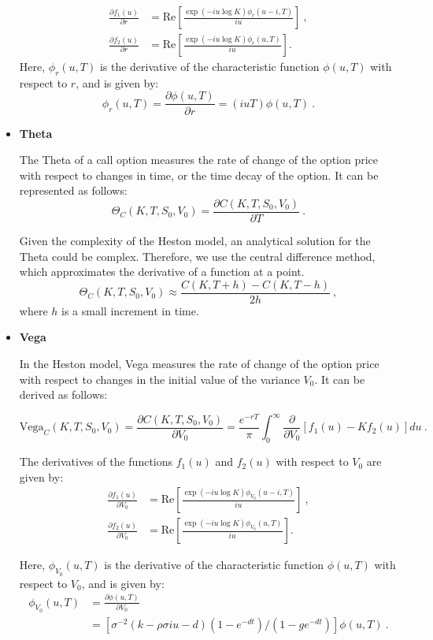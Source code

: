 \begin{itemize}
\begin{equation}
\label{eq:derivative-r-f1-f2}
\begin{aligned}
\frac{ \partial  f_1(u)   }{\partial r}&= \mathrm{Re}\left[  \frac{\exp(-iu\log K) \phi_{r}(u-i,T)   }{iu}\right] \ ,  \\  
\frac{\partial  f_2(u)   }{\partial r } &= \mathrm{Re}\left[ \frac{\exp(-iu\log K) \phi_{r}(u,T)  }{iu}\right].
\end{aligned}
\end{equation}
Here, $\phi_{r}(u,T)$ is the derivative of the characteristic function $\phi(u,T)$ with respect to $r$, and is given by:
$$
\phi_{r}(u,T) = \frac{ \partial  \phi(u,T)}{\partial r} = (i u T) \phi(u,T) \ .
$$




\item \textbf{Theta} 

The Theta of a call option measures the rate of change of the option price with respect to changes in time, or the time decay of the option. It can be represented as follows:
$$
\Theta_C(K,T, S_0, V_0) = \frac{\partial C(K,T, S_0, V_0)}{\partial T} \ . 
$$

Given the complexity of the Heston model, an analytical solution for the Theta could be complex. Therefore, we use the central difference method, which approximates the derivative of a function at a point.
$$
\Theta_C(K,T, S_0, V_0) \approx \frac{C(K,T+h) - C(K,T-h)}{2h} \ , 
$$
where $h$ is a small increment in time. 


\item \textbf{Vega} 

In the Heston model, Vega measures the rate of change of the option price with respect to changes in the initial value of the variance $V_0$. It can be derived as follows:

$$
\text{Vega}_C(K,T, S_0, V_0) = \frac{\partial C(K,T, S_0, V_0)}{\partial V_0} = \frac{e^{-r T}}{\pi} \int_0^{\infty}\frac{ \partial  }{\partial V_0}  \left[f_1(u) - Kf_2(u)\right]du \ . 
$$

The derivatives of the functions $ f_1(u) $ and $ f_2(u) $ with respect to $ V_0$ are given by:
\begin{equation}
\label{eq:derivative-v0-f1-f2}
\begin{aligned}
\frac{ \partial  f_1(u)   }{\partial V_0}&= \mathrm{Re}\left[  \frac{\exp(-iu\log K) \phi_{V_0}(u-i,T)   }{iu}\right]  \ , \\  
\frac{\partial  f_2(u)   }{\partial V_0 } &= \mathrm{Re}\left[ \frac{\exp(-iu\log K) \phi_{V_0}(u,T)  }{iu}\right].
\end{aligned}
\end{equation}

Here, $\phi_{V_0}(u,T)$ is the derivative of the characteristic function $\phi(u,T)$ with respect to $V_0$, and is given by:
$$
\begin{aligned}
\phi_{V_0}(u,T) &= \frac{ \partial  \phi(u,T)}{\partial V_0} \\ &= \left[ \sigma^{-2}(k-\rho\sigma iu - d)(1-e^{-dt})/(1-ge^{-dt}) \right] \phi(u,T) \ . 
\end{aligned}
$$

\end{itemize}
